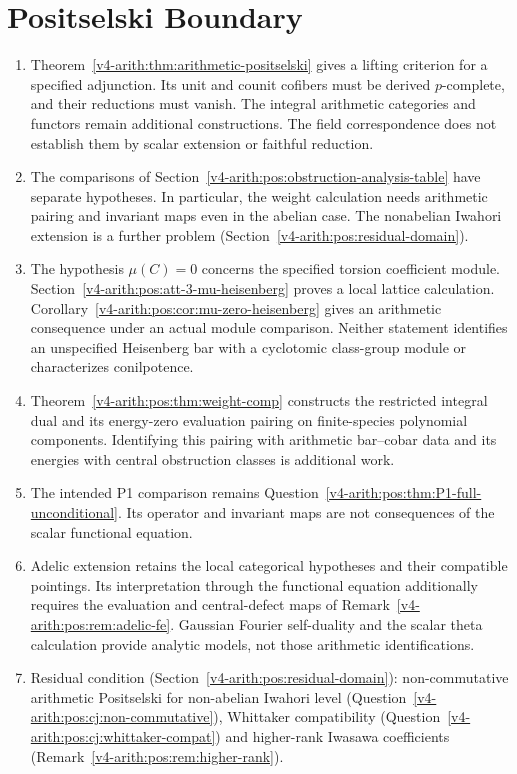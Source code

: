 \section{Positselski Boundary}
\label{v4-arith:pos:summary}

\begin{enumerate}
\item Theorem~\ref{v4-arith:thm:arithmetic-positselski} gives
a lifting criterion for a specified adjunction.
Its unit and counit cofibers must be derived \(p\)-complete,
and their reductions must vanish.
The integral arithmetic categories and functors remain
additional constructions. The field correspondence does
not establish them by scalar extension or faithful reduction.
\item The comparisons of Section~\ref{v4-arith:pos:obstruction-analysis-table}
have separate hypotheses. In particular, the weight calculation needs
arithmetic pairing and invariant maps even in the abelian case.
The nonabelian Iwahori extension is a further problem
(Section~\ref{v4-arith:pos:residual-domain}).
\item The hypothesis \(\mu(C)=0\) concerns the specified torsion
coefficient module. Section~\ref{v4-arith:pos:att-3-mu-heisenberg}
proves a local lattice calculation.
Corollary~\ref{v4-arith:pos:cor:mu-zero-heisenberg} gives an
arithmetic consequence under an actual module comparison.
Neither statement identifies an unspecified Heisenberg bar with
a cyclotomic class-group module or characterizes conilpotence.
\item Theorem~\ref{v4-arith:pos:thm:weight-comp} constructs the restricted
integral dual and its energy-zero evaluation pairing on finite-species
polynomial components. Identifying this pairing with arithmetic
bar--cobar data and its energies with central obstruction classes is
additional work.
\item The intended P1 comparison remains
Question~\ref{v4-arith:pos:thm:P1-full-unconditional}. Its operator and invariant
maps are not consequences of the scalar functional equation.
\item Adelic extension retains the local categorical hypotheses
and their compatible pointings. Its interpretation through the
functional equation additionally requires the evaluation and
central-defect maps of Remark~\ref{v4-arith:pos:rem:adelic-fe}.
Gaussian Fourier self-duality and the scalar theta calculation
provide analytic models, not those arithmetic identifications.
\item Residual condition
(Section~\ref{v4-arith:pos:residual-domain}): non-commutative arithmetic
Positselski for non-abelian Iwahori level
(Question~\ref{v4-arith:pos:cj:non-commutative}), Whittaker compatibility
(Question~\ref{v4-arith:pos:cj:whittaker-compat}) and higher-rank
Iwasawa coefficients (Remark~\ref{v4-arith:pos:rem:higher-rank}).
\end{enumerate}

